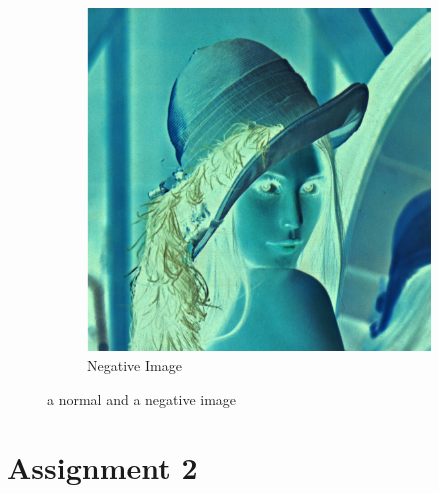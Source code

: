 \documentclass[a4paper,16pt]{article}
\begin{document}
\begin{figure}[h!]
\begin{subfigure}[h]{0.4\linewidth}
			\includegraphics[width=\linewidth]{negative}
			\caption{Negative Image}
		\end{subfigure}%
		\caption{a normal and a negative image}
	\end{figure}
	\newpage
	\section{Assignment 2}
	\vspace{0.2in}
\end{document}
